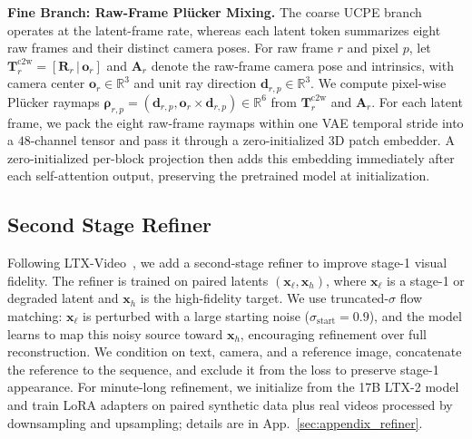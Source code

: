 \noindent \textbf{Fine Branch: Raw-Frame Pl\"ucker Mixing.}
The coarse UCPE branch operates at the latent-frame rate, whereas each latent token summarizes eight raw frames and their distinct camera poses.
For raw frame $r$ and pixel $p$, let $\mathbf{T}^{\mathrm{c2w}}_r=[\mathbf{R}_r\,|\,\mathbf{o}_r]$ and $\mathbf{A}_r$ denote the raw-frame camera pose and intrinsics, with camera center $\mathbf{o}_{r}\in\mathbb{R}^{3}$ and unit ray direction $\mathbf{d}_{r,p}\in\mathbb{R}^{3}$.
We compute pixel-wise Pl\"ucker raymaps $\boldsymbol{\rho}_{r,p}=(\mathbf{d}_{r,p},\mathbf{o}_{r}\times\mathbf{d}_{r,p})\in\mathbb{R}^{6}$ from $\mathbf{T}^{\mathrm{c2w}}_r$ and $\mathbf{A}_r$.
For each latent frame, we pack the eight raw-frame raymaps within one VAE temporal stride into a $48$-channel tensor and pass it through a zero-initialized 3D patch embedder.
A zero-initialized per-block projection then adds this embedding immediately after each self-attention output, preserving the pretrained model at initialization.


\subsection{Second Stage Refiner}
\label{sec:refiner}
Following LTX-Video~\citep{ltx_video}, we add a second-stage refiner to improve stage-1 \modelname visual fidelity. 
The refiner is trained on paired latents $(\mathbf{x}_{\ell},\mathbf{x}_{h})$, where $\mathbf{x}_{\ell}$ is a stage-1 or degraded latent and $\mathbf{x}_{h}$ is the high-fidelity target. 
We use truncated-$\sigma$ flow matching: $\mathbf{x}_{\ell}$ is perturbed with a large starting noise ($\sigma_{\mathrm{start}}=0.9$), and the model learns to map this noisy source toward $\mathbf{x}_{h}$, encouraging refinement over full reconstruction. 
We condition on text, camera, and a reference image, concatenate the reference to the sequence, and exclude it from the loss to preserve stage-1 appearance. 
For minute-long refinement, we initialize from the 17B LTX-2 model and train LoRA adapters on paired synthetic data plus real videos processed by downsampling and upsampling; details are in App.~\ref{sec:appendix_refiner}.
